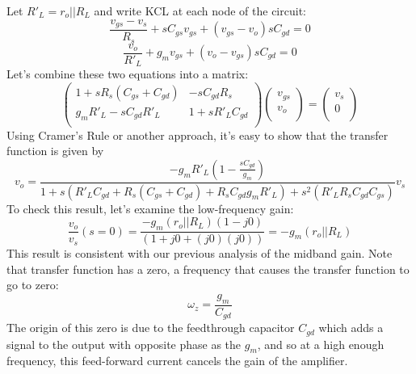 Let $R'_L = r_o || R_L$ and write KCL at each node of the circuit:
\begin{equation}
	\frac{v_{gs} - v_s}{R_s} + s C_{gs} v_{gs} + (v_{gs} - v_o) s C_{gd} = 0
\end{equation}
\begin{equation}
	\frac{v_o}{R'_L} + g_m v_{gs} + (v_o - v_{gs}) s C_{gd} = 0 
\end{equation}
Let's combine these two equations into a matrix:
\begin{equation}
	\begin{pmatrix}
	1 + s R_s (C_{gs} + C_{gd}) & -s C_{gd} R_s \\
	g_m R'_L - s C_{gd} R'_L & 1 + s R'_L C_{gd}  \\
	\end{pmatrix}
	 \begin{pmatrix}
		v_{gs} \\ v_o \\
	\end{pmatrix} 	
	=
	 \begin{pmatrix}
		v_s \\ 0 \\
	\end{pmatrix} 
\end{equation}
Using Cramer's Rule or another approach, it's easy to show that the transfer function is given by
\begin{equation}
	v_o = \frac{-g_m R'_L (1 - \frac{s C_{gd}}{g_m})}
	{1 + s \left( R'_L C_{gd} + R_s (C_{gs} + C_{gd}) + R_s C_{gd} g_m R'_L \right) 
	+ s^2 (R'_L R_s C_{gd} C_{gs}) } v_s
\label{eq:exact_transfer}
\end{equation}
To check this result, let's examine the low-frequency gain:
\begin{equation}
\frac{{{v_{o}}}}{{{v_{s}}}}(s = 0) = \frac{{ - {g_m}\left( {{r_o}||{R_L}} \right)\left( {1 - j0} \right)}}{{\left( {1 + j0 + (j0)(j0)} \right) }} =  - {g_m}\left( {{r_o}||{R_L}} \right)
\end{equation}
This result is consistent with our previous analysis of the midband gain.  Note that transfer function has a zero, a frequency that causes the transfer function to go to zero:
\begin{equation} 
	{\omega_z} = \frac{g_m}{C_{gd}}
\end{equation}
The origin of this zero is due to the feedthrough capacitor $C_{gd}$ which adds a signal to the output with opposite phase as the $g_m$, and so at a high enough frequency, this feed-forward current cancels the gain of the amplifier.
